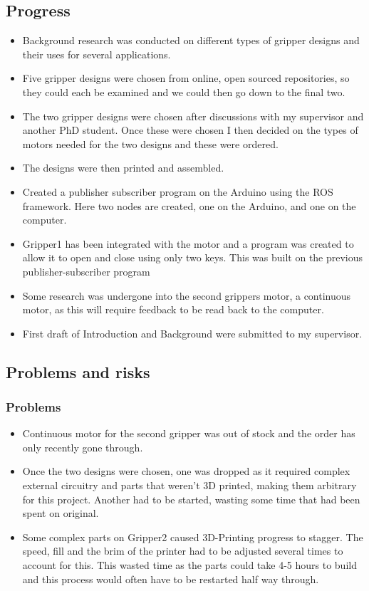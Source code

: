 \documentclass[11pt]{article}
\begin{document}
\subsection{Progress}\label{progress}
\begin{itemize}
	\item
	Background research was conducted on different types of gripper designs and their uses for several applications. 
	\item 
	Five gripper designs were chosen from online, open sourced repositories, so they could each be examined and we could then go down to the final two. 
	\item 
	The two gripper designs were chosen after discussions with my supervisor and another PhD student. Once these were chosen I then decided on the types of motors needed for the two designs and these were ordered. 
	\item
	The designs were then printed and assembled.
	\item 
	Created a publisher subscriber program on the Arduino using the ROS framework. Here two nodes are created, one on the Arduino, and one on the computer.
	\item
	Gripper1 has been integrated with the motor and a program was created to allow it to open and close using only two keys. This was built on the previous publisher-subscriber program
	\item
	Some research was undergone into the second grippers motor, a continuous motor, as this will require feedback to be read back to the computer. 
	\item
	First draft of Introduction and Background were submitted to my supervisor. 
	
\end{itemize}

\subsection{Problems and risks}\label{problems-and-risks}

\subsubsection{Problems}\label{problems}

\begin{itemize}
	\item 
	Continuous motor for the second gripper was out of stock and the order has only recently gone through.
	\item 
	Once the two designs were chosen, one was dropped as it required complex external circuitry and parts that weren't 3D printed, making them arbitrary for this project. Another had to be started, wasting some time that had been spent on original. 
	\item 
	Some complex parts on Gripper2 caused 3D-Printing progress to stagger. The speed, fill and the brim of the printer had to be adjusted several times to account for this. This wasted time as the parts could take 4-5 hours to build and this process would often have to be restarted half way through. 
\end{itemize}
\end{document}
